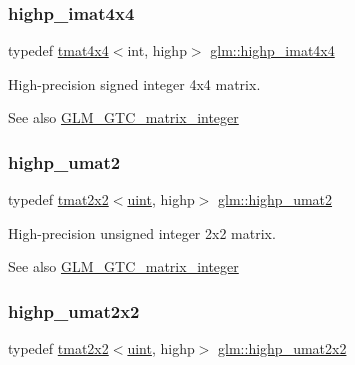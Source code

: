 \subsubsection{\texorpdfstring{highp\+\_\+imat4x4}{highp\_imat4x4}}
{\footnotesize\ttfamily typedef \hyperlink{structglm_1_1tmat4x4}{tmat4x4}$<$int, highp$>$ \hyperlink{group__gtc__matrix__integer_ga2a80b8ab686297145ecf713699233114}{glm\+::highp\+\_\+imat4x4}}

High-\/precision signed integer 4x4 matrix. \begin{DoxySeeAlso}{See also}
\hyperlink{group__gtc__matrix__integer}{G\+L\+M\+\_\+\+G\+T\+C\+\_\+matrix\+\_\+integer} 
\end{DoxySeeAlso}
\mbox{\label{group__gtc__matrix__integer_ga113fe97aa8688eaa287a02f8362f3e47}} 
\subsubsection{\texorpdfstring{highp\+\_\+umat2}{highp\_umat2}}
{\footnotesize\ttfamily typedef \hyperlink{structglm_1_1tmat2x2}{tmat2x2}$<$\hyperlink{group__core__precision_ga4fd29415871152bfb5abd588334147c8}{uint}, highp$>$ \hyperlink{group__gtc__matrix__integer_ga113fe97aa8688eaa287a02f8362f3e47}{glm\+::highp\+\_\+umat2}}

High-\/precision unsigned integer 2x2 matrix. \begin{DoxySeeAlso}{See also}
\hyperlink{group__gtc__matrix__integer}{G\+L\+M\+\_\+\+G\+T\+C\+\_\+matrix\+\_\+integer} 
\end{DoxySeeAlso}
\mbox{\label{group__gtc__matrix__integer_gaeb546847abfc7c3c09ea8172987ebb16}} 
\subsubsection{\texorpdfstring{highp\+\_\+umat2x2}{highp\_umat2x2}}
{\footnotesize\ttfamily typedef \hyperlink{structglm_1_1tmat2x2}{tmat2x2}$<$\hyperlink{group__core__precision_ga4fd29415871152bfb5abd588334147c8}{uint}, highp$>$ \hyperlink{group__gtc__matrix__integer_gaeb546847abfc7c3c09ea8172987ebb16}{glm\+::highp\+\_\+umat2x2}}

